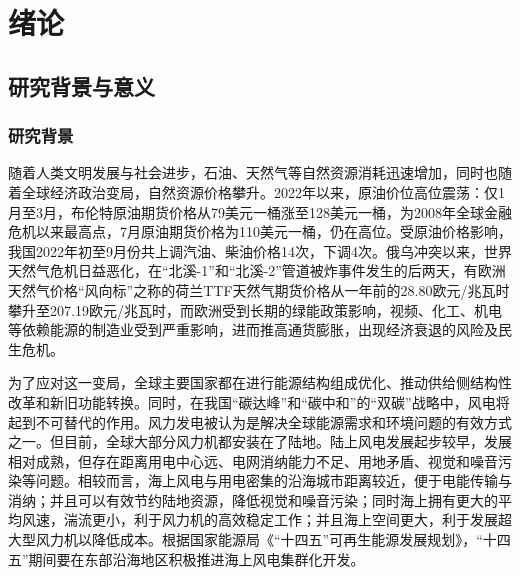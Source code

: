 \chapter{绪论}

\section{研究背景与意义}

\subsection{研究背景}

随着人类文明发展与社会进步，石油、天然气等自然资源消耗迅速增加，同时也随着全球经济政治变局，自然资源价格攀升。2022年以来，原油价位高位震荡：仅1月至3月，布伦特原油期货价格从79美元一桶涨至128美元一桶，为2008年全球金融危机以来最高点，7月原油期货价格为110美元一桶，仍在高位。受原油价格影响，我国2022年初至9月份共上调汽油、柴油价格14次，下调4次\cite{2022年以来主要大宗商品价格走势分析}。俄乌冲突以来，世界天然气危机日益恶化，在“北溪-1”和“北溪-2”管道被炸事件发生的后两天，有欧洲天然气价格“风向标”之称的荷兰TTF天然气期货价格从一年前的28.80欧元/兆瓦时攀升至207.19欧元/兆瓦时，而欧洲受到长期的绿能政策影响，视频、化工、机电等依赖能源的制造业受到严重影响，进而推高通货膨胀，出现经济衰退的风险及民生危机。

为了应对这一变局，全球主要国家都在进行能源结构组成优化、推动供给侧结构性改革和新旧功能转换。同时，在我国“碳达峰”和“碳中和”的“双碳”战略中，风电将起到不可替代的作用。风力发电被认为是解决全球能源需求和环境问题的有效方式之一。但目前，全球大部分风力机都安装在了陆地。陆上风电发展起步较早，发展相对成熟，但存在距离用电中心远、电网消纳能力不足、用地矛盾、视觉和噪音污染等问题。相较而言，海上风电与用电密集的沿海城市距离较近，便于电能传输与消纳；并且可以有效节约陆地资源，降低视觉和噪音污染；同时海上拥有更大的平均风速，湍流更小，利于风力机的高效稳定工作；并且海上空间更大，利于发展超大型风力机以降低成本。根据国家能源局《“十四五”可再生能源发展规划》，“十四五”期间要在东部沿海地区积极推进海上风电集群化开发。

